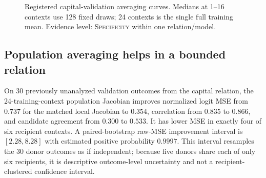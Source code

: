 \documentclass[10pt]{article}
\newcommand{\level}[1]{{\scriptsize\textsc{#1}}}
\begin{document}
\begin{figure}[t]
\centering
\begin{minipage}{0.48\linewidth}
\centering
{}
\end{minipage}\hfill
\begin{minipage}{0.48\linewidth}
\centering
{}
\end{minipage}
\caption{Registered capital-validation averaging curves.  Medians at 1--16
contexts use 128 fixed draws; 24 contexts is the single full training mean.
Evidence level: \level{Specificity} within one relation/model.}
\label{fig:averaging}
\end{figure}

\subsection{Population averaging helps in a bounded relation}

On 30 previously unanalyzed validation outcomes from the capital relation, the
24-training-context population Jacobian improves normalized logit MSE from
$0.737$ for the matched local Jacobian to $0.354$, correlation from $0.835$ to
$0.866$, and candidate agreement from $0.300$ to $0.533$.  It has lower MSE in
exactly four of six recipient contexts.  A paired-bootstrap raw-MSE improvement
interval is $[2.28,8.28]$ with estimated positive probability $0.9997$.
This interval resamples the 30 donor outcomes as if independent; because five
donors share each of only six recipients, it is descriptive outcome-level
uncertainty and not a recipient-clustered confidence interval.
\end{document}
